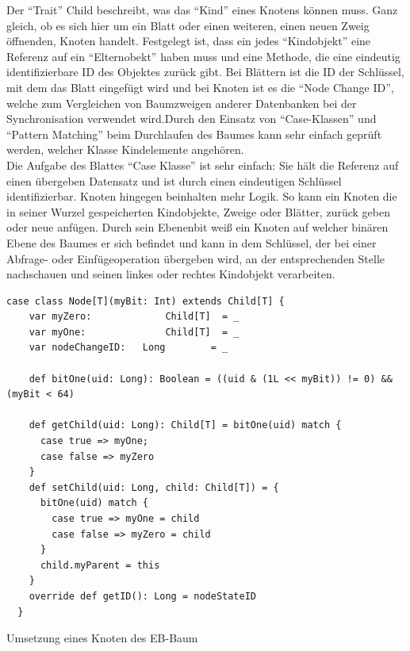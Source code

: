 \documentclass[a4paper,11pt,oneside,%
headsepline,												%
footsepline,												%
bibtotocnumbered									%
]{scrreprt}
\begin{document}
Der \enquote{Trait} Child beschreibt, was das \enquote{Kind} eines Knotens können muss. Ganz gleich, ob es sich hier um ein Blatt oder einen weiteren, einen neuen Zweig öffnenden, Knoten handelt. Festgelegt ist, dass ein jedes \enquote{Kindobjekt} eine Referenz auf ein \enquote{Elternobekt} haben muss und eine Methode, die eine eindeutig identifizierbare ID des Objektes zurück gibt. Bei Blättern ist die ID der Schlüssel, mit dem das Blatt eingefügt wird und bei Knoten ist es die \enquote{Node Change ID}, welche zum Vergleichen von Baumzweigen anderer Datenbanken bei der Synchronisation verwendet wird.Durch den Einsatz von \enquote{Case-Klassen} und \enquote{Pattern Matching} beim Durchlaufen des Baumes kann sehr einfach geprüft werden, welcher Klasse Kindelemente angehören. \\

Die Aufgabe des Blattes \enquote{Case Klasse} ist sehr einfach: Sie hält die Referenz auf einen übergeben Datensatz und ist durch einen eindeutigen Schlüssel identifizierbar. Knoten hingegen beinhalten mehr Logik.  So kann ein Knoten die in seiner Wurzel gespeicherten Kindobjekte, Zweige oder Blätter, zurück geben oder neue anfügen. Durch sein Ebenenbit weiß ein Knoten auf welcher binären Ebene des Baumes er sich befindet und kann in dem Schlüssel, der bei einer Abfrage- oder Einfügeoperation übergeben wird, an der entsprechenden Stelle nachschauen und seinen linkes oder rechtes Kindobjekt verarbeiten.

\begin{listing}[H]
	\begin{verbatim}
case class Node[T](myBit: Int) extends Child[T] {
    var myZero:				Child[T]  = _
    var myOne:				Child[T]  = _
    var nodeChangeID:	Long    	= _

    def bitOne(uid: Long): Boolean = ((uid & (1L << myBit)) != 0) && (myBit < 64)

    def getChild(uid: Long): Child[T] = bitOne(uid) match {
      case true => myOne;
      case false => myZero
    }
    def setChild(uid: Long, child: Child[T]) = {
      bitOne(uid) match {
        case true => myOne = child
        case false => myZero = child
      }
      child.myParent = this
    }
    override def getID(): Long = nodeStateID
  }	
	\end{verbatim}
	\caption{Umsetzung eines Knoten des \ac{EB-Baum}}
	\label{lst:Knoten EB-Baum}
\end{listing}
\end{document}
